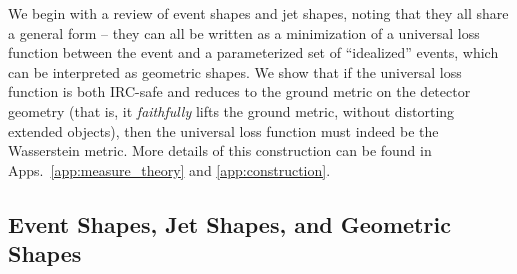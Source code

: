 \documentclass[letterpaper,11pt]{article}
\newcommand{\Rikab}[1]{\textbf{\color{mit-red}[#1 --Rikab]}}
\DeclareRobustCommand{\Apps}[2]{Apps.~\ref{app:#1} and \ref{app:#2}}
\begin{document}
We begin with a review of event shapes and jet shapes, noting that they all share a general form -- they can all be written as a minimization of a universal loss function between the event and a parameterized set of ``idealized'' events, which can be interpreted as geometric shapes.
%
We show that if the universal loss function is both IRC-safe and reduces to the ground metric on the detector geometry (that is, it \emph{faithfully} lifts the ground metric, without distorting extended objects), then the universal loss function must indeed be the Wasserstein metric. More details of this construction can be found in \Apps{measure_theory}{construction}.







\subsection{Event Shapes, Jet Shapes, and Geometric Shapes}\label{sec:shapes}
\end{document}
